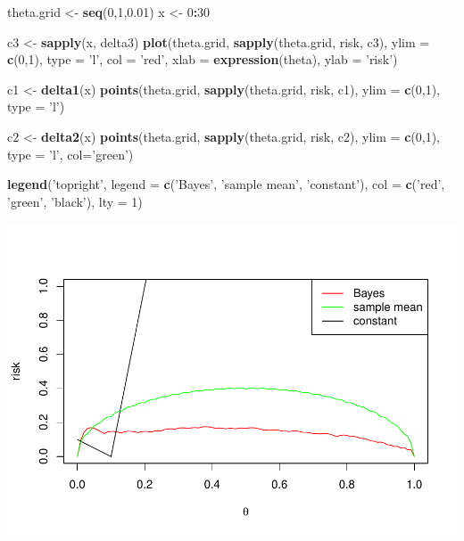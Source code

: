 \documentclass[
]{article}
\newenvironment{Shaded}{\begin{snugshade}}{\end{snugshade}}
\newcommand{\DataTypeTok}[1]{\textcolor[rgb]{0.13,0.29,0.53}{#1}}
\newcommand{\DecValTok}[1]{\textcolor[rgb]{0.00,0.00,0.81}{#1}}
\newcommand{\FloatTok}[1]{\textcolor[rgb]{0.00,0.00,0.81}{#1}}
\newcommand{\KeywordTok}[1]{\textcolor[rgb]{0.13,0.29,0.53}{\textbf{#1}}}
\newcommand{\NormalTok}[1]{#1}
\newcommand{\OperatorTok}[1]{\textcolor[rgb]{0.81,0.36,0.00}{\textbf{#1}}}
\newcommand{\StringTok}[1]{\textcolor[rgb]{0.31,0.60,0.02}{#1}}
\begin{document}
\begin{Shaded}
\begin{Highlighting}[]
\NormalTok{theta.grid <-}\StringTok{ }\KeywordTok{seq}\NormalTok{(}\DecValTok{0}\NormalTok{,}\DecValTok{1}\NormalTok{,}\FloatTok{0.01}\NormalTok{)}
\NormalTok{x <-}\StringTok{ }\DecValTok{0}\OperatorTok{:}\DecValTok{30}

\NormalTok{c3 <-}\StringTok{ }\KeywordTok{sapply}\NormalTok{(x, delta3)}
\KeywordTok{plot}\NormalTok{(theta.grid, }\KeywordTok{sapply}\NormalTok{(theta.grid, risk, c3), }\DataTypeTok{ylim =} \KeywordTok{c}\NormalTok{(}\DecValTok{0}\NormalTok{,}\DecValTok{1}\NormalTok{), }\DataTypeTok{type =} \StringTok{'l'}\NormalTok{, }\DataTypeTok{col =} \StringTok{'red'}\NormalTok{, }\DataTypeTok{xlab =} \KeywordTok{expression}\NormalTok{(theta), }\DataTypeTok{ylab =} \StringTok{'risk'}\NormalTok{)}

\NormalTok{c1 <-}\StringTok{ }\KeywordTok{delta1}\NormalTok{(x)}
\KeywordTok{points}\NormalTok{(theta.grid, }\KeywordTok{sapply}\NormalTok{(theta.grid, risk, c1), }\DataTypeTok{ylim =} \KeywordTok{c}\NormalTok{(}\DecValTok{0}\NormalTok{,}\DecValTok{1}\NormalTok{), }\DataTypeTok{type =} \StringTok{'l'}\NormalTok{)}

\NormalTok{c2 <-}\StringTok{ }\KeywordTok{delta2}\NormalTok{(x)}
\KeywordTok{points}\NormalTok{(theta.grid, }\KeywordTok{sapply}\NormalTok{(theta.grid, risk, c2), }\DataTypeTok{ylim =} \KeywordTok{c}\NormalTok{(}\DecValTok{0}\NormalTok{,}\DecValTok{1}\NormalTok{), }\DataTypeTok{type =} \StringTok{'l'}\NormalTok{, }\DataTypeTok{col=}\StringTok{'green'}\NormalTok{)}

\KeywordTok{legend}\NormalTok{(}\StringTok{'topright'}\NormalTok{, }\DataTypeTok{legend =} \KeywordTok{c}\NormalTok{(}\StringTok{'Bayes'}\NormalTok{, }\StringTok{'sample mean'}\NormalTok{, }\StringTok{'constant'}\NormalTok{), }\DataTypeTok{col =} \KeywordTok{c}\NormalTok{(}\StringTok{'red'}\NormalTok{, }\StringTok{'green'}\NormalTok{, }\StringTok{'black'}\NormalTok{), }\DataTypeTok{lty =} \DecValTok{1}\NormalTok{)}
\end{Highlighting}
\end{Shaded}

\includegraphics{lab-03_files/figure-latex/unnamed-chunk-8-1.pdf}
\end{document}
